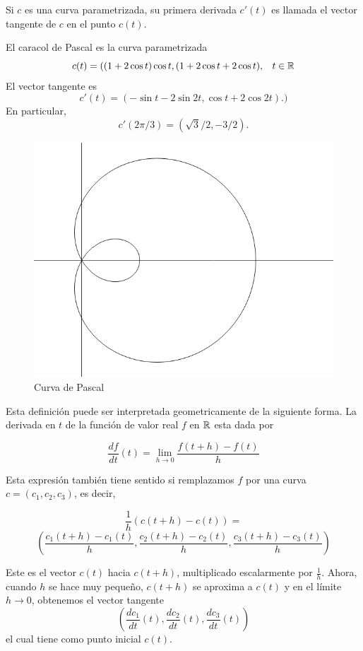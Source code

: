 \begin{definition}
    Si $c$ es una curva parametrizada, su primera derivada $c'(t)$ es llamada el vector tangente
    de $c$ en el punto $c(t)$.
\end{definition}

\begin{myExample}
    El caracol de Pascal es la curva parametrizada
    $$ c(t)=((1+2\cos{t})\cos{t},(1+2\cos{t}+2\cos{t})\text{,} \quad t \in \mathbb{R}$$
    El vector tangente es
    $$ c'(t)=(-\sin{t}-2\sin{2t},\cos{t}+2\cos{2t})\text{.})$$
    En particular,
    $$ c'(2\pi/3) = (\sqrt{3}/2,-3/2)\text{.}$$
\end{myExample}

\begin{figure}[!ht]
  \begin{center}
      \includegraphics[width=0.7\linewidth]{gfx/limacon2}
      \caption{Curva de Pascal}
      \label{fig:boat1}
  \end{center}
\end{figure}


Esta definición puede ser interpretada geometricamente de la siguiente forma. La derivada en
$t$ de la función de valor real $f$ en $\mathbb{R}$ esta dada por

$$ \frac{df}{dt}(t) = \lim_{h \rightarrow 0} \frac{f(t+h)-f(t)}{h} $$

Esta expresión también tiene sentido si remplazamos $f$ por una curva $c = (c_{1},c_{2},c_{3})$,
es decir,

$$ \frac{1}{h}(c(t+h)-c(t)) =$$
$$\left( \frac{c_{1}(t+h)-c_{1}(t)}{h},\frac{c_{2}(t+h)-c_{2}(t)}{h},\frac{c_{3}(t+h)-c_{3}(t)}{h} \right) $$

Este es el vector $c(t)$ hacia $c(t+h)$, multiplicado escalarmente por $\frac{1}{h}$. Ahora, cuando $h$ se hace
muy pequeño, $c(t+h)$ se aproxima a $c(t)$ y en el límite $h \rightarrow 0$, obtenemos el vector tangente
$$\left( \frac{dc_{1}}{dt}(t),\frac{dc_{2}}{dt}(t),\frac{dc_{3}}{dt}(t) \right) $$
el cual tiene como punto inicial $c(t)$.

